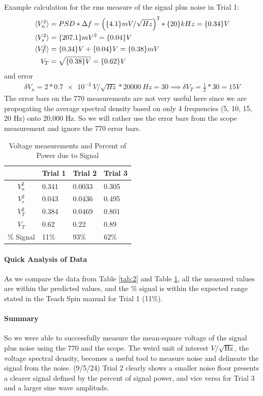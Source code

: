 \documentclass[../main.tex]{subfiles}
\begin{document}
Example calculation for the rms measure of the signal plus noise in Trial 1:
\begin{align*}
    \langle V_n^2 \rangle &= PSD * \Delta f  = \qt(\qty{4.1}{mV/\sqrt{Hz}})^2 * \qty{20}{kHz} = \qty{0.34}{V} \\
    \langle V_s^2 \rangle &= \qty{207.1}{mV}^2 = \qty{0.04}{V} \\
    \langle V_T^2 \rangle &= \qty{0.34}{V} + \qty{0.04}{V} = \qty{0.38}{mV} \\
    V_T &= \sqrt{\qty{0.38}{V}} = \qty{0.62}{V}
\end{align*}
and error
\begin{align*}
    \delta V_n = 2 * \qty{0.7e-3}{V/\sqrt{Hz}} * \qty{20000}{Hz} = 30 \implies \delta V_T = \frac{1}{2} * 30 = 15 V
\end{align*}
The error bars on the 770 measurements are not very useful here since we are propogating the average spectral density based on only 4 frequencies (5, 10, 15, 20 Hz) onto 20,000 Hz.
So we will rather use the error bars from the scope measurement and ignore the 770 error bars.

\begin{table}[!ht]
    \centering
    \begin{tabular}{|c|l|l|l|}
    \hline
        & Trial 1 & Trial 2 & Trial 3 \\ \hline
        $V_n^2$ & 0.341 & 0.0033 & 0.305 \\ \hline
        $V_s^2$ & 0.043 & 0.0436 & 0.495 \\ \hline
        $V_T^2$ & 0.384 & 0.0469 & 0.801 \\ \hline
        $V _T$ & 0.62 & 0.22 & 0.89 \\ \hline
        \% Signal & 11\% & 93\% & 62\% \\ \hline
    \end{tabular}
    \caption{Voltage measurements and Percent of Power due to Signal}
    \label{tab:3}
\end{table}

\paragraph*{Quick Analysis of Data}
As we compare the data from Table \ref{tab:2} and Table \ref{tab:3}, all the measured values are within the predicted values, and the \% signal is within the expected range stated 
in the Teach Spin manual for Trial 1 (11\%).

\paragraph*{Summary}
So we were able to successfully measure the mean-square voltage of the signal plus noise using the 770 and the scope.
The weird unit of interest $V/\sqrt{\text{Hz}}$, the voltage spectral density, becomes a useful tool to measure noise and delineate 
the signal from the noise. (9/5/24) Trial 2 clearly shows a smaller noise floor presents a clearer signal defined by the percent of signal power,
and vice versa for Trial 3 and a larger sine wave amplitude.
\end{document}
